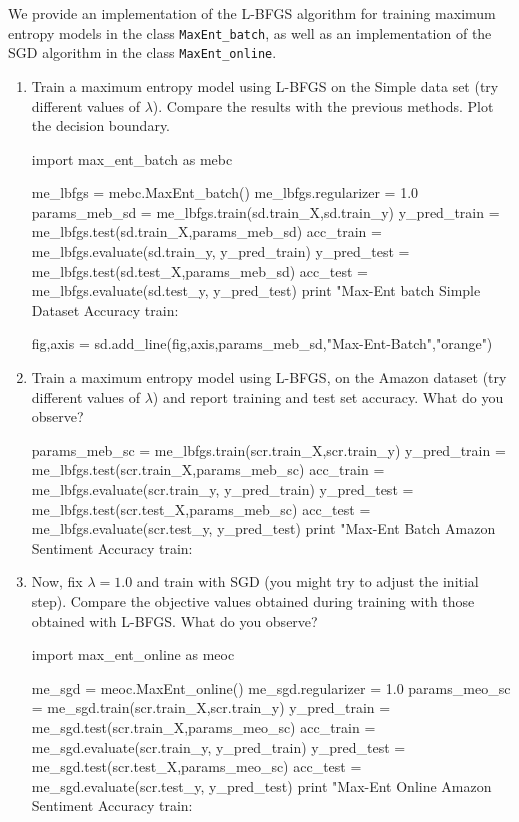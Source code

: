 \begin{exercise}
We provide an implementation of the L-BFGS algorithm for training maximum entropy models in the class {\tt MaxEnt\_batch}, 
as well as an implementation of the SGD algorithm in the class {\tt MaxEnt\_online}. 
\begin{enumerate}
\item Train a  maximum entropy model using L-BFGS on the Simple data
  set (try different values of $\lambda$). Compare the results with the previous methods. Plot the decision boundary. 
\begin{python}
import max_ent_batch as mebc

me_lbfgs = mebc.MaxEnt_batch()
me_lbfgs.regularizer = 1.0
params_meb_sd = me_lbfgs.train(sd.train_X,sd.train_y)
y_pred_train = me_lbfgs.test(sd.train_X,params_meb_sd)
acc_train = me_lbfgs.evaluate(sd.train_y, y_pred_train)
y_pred_test = me_lbfgs.test(sd.test_X,params_meb_sd)
acc_test = me_lbfgs.evaluate(sd.test_y, y_pred_test)
print "Max-Ent batch Simple Dataset Accuracy train: %

fig,axis = sd.add_line(fig,axis,params_meb_sd,"Max-Ent-Batch","orange")
\end{python}

\item Train a maximum entropy model using L-BFGS, on the Amazon
  dataset (try different values of $\lambda$) and report training and test set accuracy. What do you observe? 
\begin{python}
params_meb_sc = me_lbfgs.train(scr.train_X,scr.train_y)
y_pred_train = me_lbfgs.test(scr.train_X,params_meb_sc)
acc_train = me_lbfgs.evaluate(scr.train_y, y_pred_train)
y_pred_test = me_lbfgs.test(scr.test_X,params_meb_sc)
acc_test = me_lbfgs.evaluate(scr.test_y, y_pred_test)
print "Max-Ent Batch Amazon Sentiment Accuracy train: %
\end{python}

\item Now, fix $\lambda = 1.0$ and train with SGD (you might try to adjust the initial step). 
Compare the objective values obtained during training with those obtained with L-BFGS. What do you observe? 
\begin{python}
import max_ent_online as meoc

me_sgd = meoc.MaxEnt_online()
me_sgd.regularizer = 1.0
params_meo_sc = me_sgd.train(scr.train_X,scr.train_y)
y_pred_train = me_sgd.test(scr.train_X,params_meo_sc)
acc_train = me_sgd.evaluate(scr.train_y, y_pred_train)
y_pred_test = me_sgd.test(scr.test_X,params_meo_sc)
acc_test = me_sgd.evaluate(scr.test_y, y_pred_test)
print "Max-Ent Online Amazon Sentiment Accuracy train: %
\end{python}
\end{enumerate}
\end{exercise}



